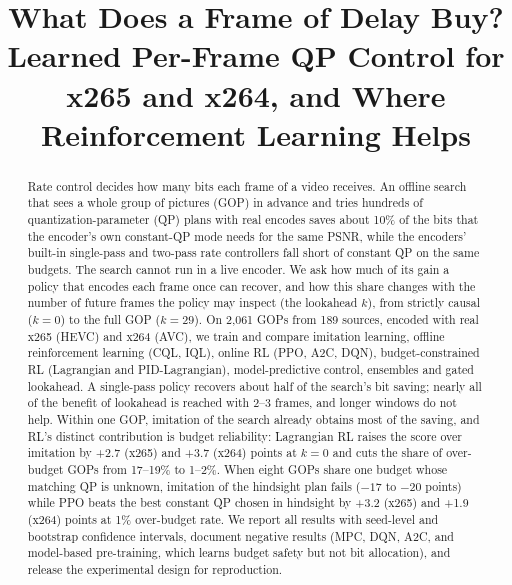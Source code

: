 \documentclass[conference]{IEEEtran}
\begin{document}
\title{What Does a Frame of Delay Buy? Learned Per-Frame QP Control for x265 and x264, and Where Reinforcement Learning Helps}

\author{
}

\maketitle

\begin{abstract}
Rate control decides how many bits each frame of a video receives. An offline search that sees a whole group of pictures (GOP) in advance and tries hundreds of quantization-parameter (QP) plans with real encodes saves about 10\% of the bits that the encoder's own constant-QP mode needs for the same PSNR, while the encoders' built-in single-pass and two-pass rate controllers fall short of constant QP on the same budgets. The search cannot run in a live encoder. We ask how much of its gain a policy that encodes each frame once can recover, and how this share changes with the number of future frames the policy may inspect (the lookahead $k$), from strictly causal ($k{=}0$) to the full GOP ($k{=}29$). On 2{,}061 GOPs from 189 sources, encoded with real x265 (HEVC) and x264 (AVC), we train and compare imitation learning, offline reinforcement learning (CQL, IQL), online RL (PPO, A2C, DQN), budget-constrained RL (Lagrangian and PID-Lagrangian), model-predictive control, ensembles and gated lookahead. A single-pass policy recovers about half of the search's bit saving; nearly all of the benefit of lookahead is reached with 2--3 frames, and longer windows do not help. Within one GOP, imitation of the search already obtains most of the saving, and RL's distinct contribution is budget reliability: Lagrangian RL raises the score over imitation by +2.7 (x265) and +3.7 (x264) points at $k{=}0$ and cuts the share of over-budget GOPs from 17--19\% to 1--2\%. When eight GOPs share one budget whose matching QP is unknown, imitation of the hindsight plan fails ($-17$ to $-20$ points) while PPO beats the best constant QP chosen in hindsight by +3.2 (x265) and +1.9 (x264) points at 1\% over-budget rate. We report all results with seed-level and bootstrap confidence intervals, document negative results (MPC, DQN, A2C, and model-based pre-training, which learns budget safety but not bit allocation), and release the experimental design for reproduction.
\end{abstract}
\end{document}
